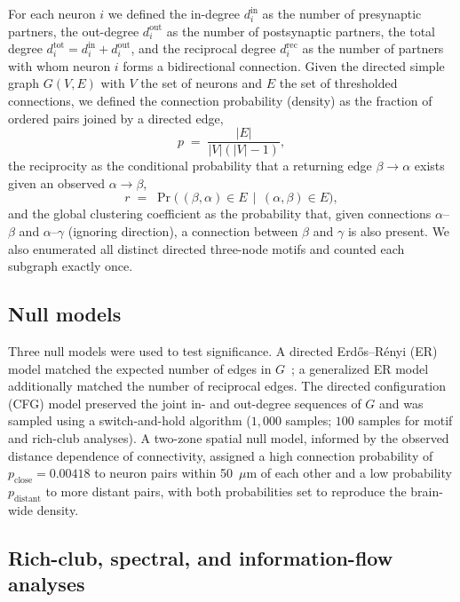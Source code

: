 \documentclass[11pt]{article}
\begin{document}
For each neuron $i$ we defined the in-degree $d^{\text{in}}_i$ as the
number of presynaptic partners, the out-degree $d^{\text{out}}_i$ as the
number of postsynaptic partners, the total degree
$d^{\text{tot}}_i = d^{\text{in}}_i + d^{\text{out}}_i$, and the reciprocal
degree $d^{\text{rec}}_i$ as the number of partners with whom neuron $i$
forms a bidirectional connection. Given the directed simple graph
$G(V,E)$ with $V$ the set of neurons and $E$ the set of thresholded
connections, we defined the connection probability (density) as the
fraction of ordered pairs joined by a directed edge,
\begin{equation}
p \;=\; \frac{|E|}{|V|(|V|-1)},
\end{equation}
the reciprocity as the conditional probability that a returning edge
$\beta\!\to\!\alpha$ exists given an observed $\alpha\!\to\!\beta$,
\begin{equation}
r \;=\; \Pr\bigl(\,(\beta,\alpha)\in E \,\mid\, (\alpha,\beta)\in E\bigr),
\end{equation}
and the global clustering coefficient as the probability that, given
connections $\alpha$--$\beta$ and $\alpha$--$\gamma$ (ignoring direction),
a connection between $\beta$ and $\gamma$ is also present. We also
enumerated all distinct directed three-node motifs and counted each
subgraph exactly once.

\subsection{Null models}

Three null models were used to test significance. A directed
Erd{\H o}s--R{\'e}nyi (ER) model matched the expected number of edges in
$G$~\cite{erdos1960evolution}; a generalized ER model additionally matched
the number of reciprocal edges. The directed configuration (CFG) model
preserved the joint in- and out-degree sequences of $G$ and was sampled
using a switch-and-hold algorithm ($1{,}000$ samples; $100$ samples for
motif and rich-club analyses). A two-zone spatial null model, informed by
the observed distance dependence of connectivity, assigned a high
connection probability of $p_{\text{close}} = 0.00418$ to neuron pairs
within 50~$\mu$m of each other and a low probability
$p_{\text{distant}}$ to more distant pairs, with both probabilities set to
reproduce the brain-wide density.

\subsection{Rich-club, spectral, and information-flow analyses}
\end{document}
